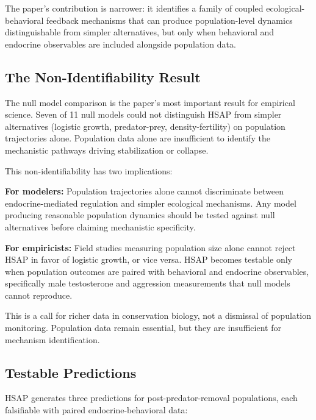 The paper's contribution is narrower: it identifies a family of coupled ecological-behavioral feedback mechanisms that can produce population-level dynamics distinguishable from simpler alternatives, but only when behavioral and endocrine observables are included alongside population data.

\subsection{The Non-Identifiability Result}

The null model comparison is the paper's most important result for empirical science. Seven of 11 null models could not distinguish HSAP from simpler alternatives (logistic growth, predator-prey, density-fertility) on population trajectories alone. Population data alone are insufficient to identify the mechanistic pathways driving stabilization or collapse.

This non-identifiability has two implications:

\textbf{For modelers:} Population trajectories alone cannot discriminate between endocrine-mediated regulation and simpler ecological mechanisms. Any model producing reasonable population dynamics should be tested against null alternatives before claiming mechanistic specificity.

\textbf{For empiricists:} Field studies measuring population size alone cannot reject HSAP in favor of logistic growth, or vice versa. HSAP becomes testable only when population outcomes are paired with behavioral and endocrine observables, specifically male testosterone and aggression measurements that null models cannot reproduce.

This is a call for richer data in conservation biology, not a dismissal of population monitoring. Population data remain essential, but they are insufficient for mechanism identification.

\subsection{Testable Predictions}

HSAP generates three predictions for post-predator-removal populations, each falsifiable with paired endocrine-behavioral data:

